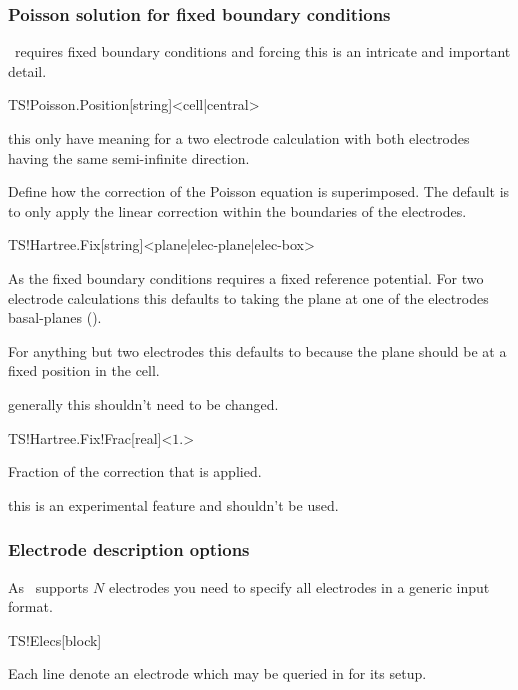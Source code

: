 \subsubsection{Poisson solution for fixed boundary conditions}

\tsiesta\ requires fixed boundary conditions and forcing this is an
intricate and important detail. 

\begin{fdfentry}{TS!Poisson.Position}[string]<cell|central>

  \note this only have meaning for a two electrode calculation with
  both electrodes having the same semi-infinite direction.

  Define how the correction of the Poisson equation is
  superimposed. The default is to only apply the linear correction
  within the boundaries of the electrodes. 

\end{fdfentry}

\begin{fdfentry}{TS!Hartree.Fix}[string]<plane|elec-plane|elec-box>

  As the fixed boundary conditions requires a fixed reference
  potential. For two electrode calculations this defaults to taking
  the plane at one of the electrodes basal-planes (). 

  For anything but two electrodes this defaults to 
  because the plane should be at a fixed position in the cell. 

  \note generally this shouldn't need to be changed.

\end{fdfentry}

\begin{fdfentry}{TS!Hartree.Fix!Frac}[real]<$1.$>

  Fraction of the correction that is applied.

  \note this is an experimental feature and shouldn't be used.

\end{fdfentry}


\subsubsection{Electrode description options}

As \tsiesta\ supports $N$ electrodes you need to specify all
electrodes in a generic input format.

\begin{fdfentry}{TS!Elecs}[block]

  Each line denote an electrode which may be queried in
   for its setup.
  
\end{fdfentry}

